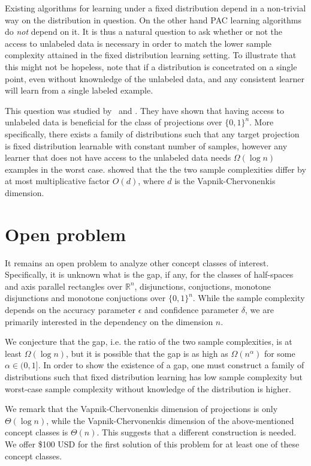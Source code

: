 \documentclass[12pt]{colt2019}
\newcommand{\R}{\mathbb{R}}
\begin{document}
Existing algorithms for learning under a fixed distribution depend in a
non-trivial way on the distribution in question. On the other hand PAC learning
algorithms do \emph{not} depend on it. It is thus a natural question to ask
whether or not the access to unlabeled data is necessary in order to match the
lower sample complexity attained in the fixed distribution learning setting.
To illustrate that this might not be hopeless, note that if a distribution
is concetrated on a single point, even without knownledge of the unlabeled data,
and any consistent learner will learn from a single labeled example.

This question was studied by~\cite{Darnstadt-Simon-Szorenyi-2013} and
\cite{Golovnev-Pal-Szorenyi-2019}. They have shown that having access to
unlabeled data is beneficial for the class of projections over $\{0,1\}^n$. More
specifically, there exists a family of distributions such that any target
projection is fixed distribution learnable with constant number of samples,
however any learner that does not have access to the unlabeled data needs
$\Omega(\log n)$ examples in the worst case.
\cite{Darnstadt-Simon-Szorenyi-2013} showed that the the two sample complexities
differ by at most multiplicative factor $O(d)$, where $d$ is the
Vapnik-Chervonenkis dimension.

\section{Open problem}

It remains an open problem to analyze other concept classes of interest.
Specifically, it is unknown what is the gap, if any, for the classes of
half-spaces and axis parallel rectangles over $\R^n$, disjunctions, conjuctions,
monotone disjunctions and monotone conjuctions over $\{0,1\}^n$. While the
sample complexity depends on the accuracy parameter $\epsilon$ and confidence
parameter $\delta$, we are primarily interested in the dependency on the
dimension $n$.

We conjecture that the gap, i.e. the ratio of the two sample complexities, is at
least $\Omega(\log n)$, but it is possible that the gap is as high as
$\Omega(n^\alpha)$ for some $\alpha \in (0,1]$. In order to show the existence
of a gap, one must construct a family of distributions such that fixed
distribution learning has low sample complexity but worst-case sample complexity
without knowledge of the distribution is higher.

We remark that the Vapnik-Chervonenkis dimension of projections is only
$\Theta(\log n)$, while the Vapnik-Chervonenkis dimension of the above-mentioned
concept classes is $\Theta(n)$. This suggests that a different construction is
needed. We offer \$100 USD for the first solution of this problem for at least
one of these concept classes.


\end{document}
